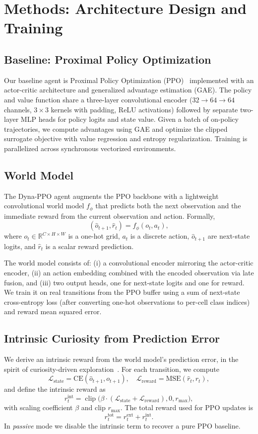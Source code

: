 ﻿\documentclass[sigconf]{acmart}
\begin{document}
\section{Methods: Architecture Design and Training}
\label{sec:methods}

\subsection{Baseline: Proximal Policy Optimization}
Our baseline agent is Proximal Policy Optimization (PPO)~\cite{schulman2017ppo} implemented with an actor-critic architecture and generalized advantage estimation (GAE). The policy and value function share a three-layer convolutional encoder ($32 \to 64 \to 64$ channels, $3{\times}3$ kernels with padding, ReLU activations) followed by separate two-layer MLP heads for policy logits and state value. Given a batch of on-policy trajectories, we compute advantages using GAE and optimize the clipped surrogate objective with value regression and entropy regularization. Training is parallelized across synchronous vectorized environments.

\subsection{World Model}
The Dyna-PPO agent augments the PPO backbone with a lightweight convolutional world model $f_\phi$ that predicts both the next observation and the immediate reward from the current observation and action. Formally,
\[
(\hat{o}_{t+1}, \hat{r}_t) = f_\phi(o_t, a_t),
\]
where $o_t \in \mathbb{R}^{C \times H \times W}$ is a one-hot grid, $a_t$ is a discrete action, $\hat{o}_{t+1}$ are next-state logits, and $\hat{r}_t$ is a scalar reward prediction.

The world model consists of: (i) a convolutional encoder mirroring the actor-critic encoder, (ii) an action embedding combined with the encoded observation via late fusion, and (iii) two output heads, one for next-state logits and one for reward. We train it on real transitions from the PPO buffer using a sum of next-state cross-entropy loss (after converting one-hot observations to per-cell class indices) and reward mean squared error.

\subsection{Intrinsic Curiosity from Prediction Error}
We derive an intrinsic reward from the world model's prediction error, in the spirit of curiosity-driven exploration~\cite{pathak2017curiosity}. For each transition, we compute
\[
\mathcal{L}_{\text{state}} = \text{CE}(\hat{o}_{t+1}, o_{t+1}), \quad
\mathcal{L}_{\text{reward}} = \text{MSE}(\hat{r}_t, r_t),
\]
and define the intrinsic reward as
\[
r_t^{\text{int}} = \operatorname{clip}\big(\beta \cdot (\mathcal{L}_{\text{state}} + \mathcal{L}_{\text{reward}}), 0, r_{\max}\big),
\]
with scaling coefficient $\beta$ and clip $r_{\max}$. The total reward used for PPO updates is
\[
r_t^{\text{tot}} = r_t^{\text{ext}} + r_t^{\text{int}}.
\]
In \emph{passive} mode we disable the intrinsic term to recover a pure PPO baseline.
\end{document}
